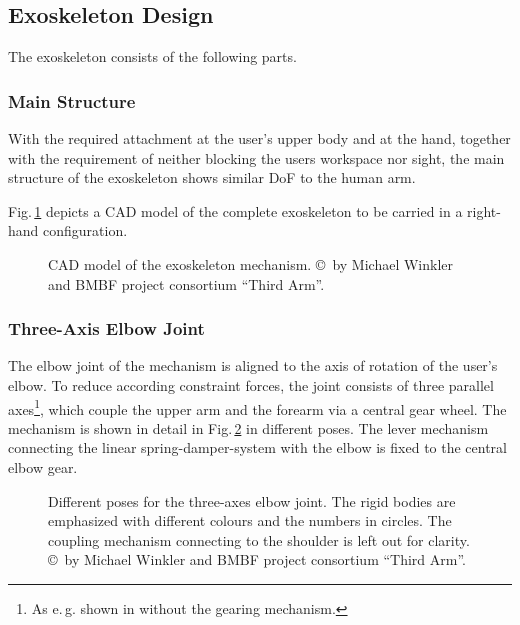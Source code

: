 \documentclass[twocolumn,10pt]{IFTOMM}
\begin{document}
\subsection{Exoskeleton Design}
\label{sec:exo_des}
The exoskeleton consists of the following parts.

\subsubsection{Main Structure}
\label{sec:exo_des_main}

With the required attachment at the user's upper body and at the hand, together with the requirement of neither blocking the users workspace nor sight, the main structure of the exoskeleton shows similar DoF to the human arm.

Fig.\,\ref{fig:KAS5_CAD} depicts a CAD model of the complete exoskeleton to be carried in a right-hand configuration.


\begin{figure}[tb!]
    
    \caption{CAD model of the exoskeleton mechanism. \copyright \, by Michael Winkler and BMBF project consortium ``Third Arm''.}
    \label{fig:KAS5_CAD}
\end{figure} 

\subsubsection{Three-Axis Elbow Joint}
\label{sec:exo_des_elbow}

The elbow joint of the mechanism is aligned to the axis of rotation of the user's elbow.
To reduce according constraint forces, the joint consists of three parallel axes\footnote{As e.\,g. shown in \cite{Pons2008} without the gearing mechanism.}, which couple the upper arm and the forearm via a central gear wheel.
The mechanism is shown in detail in Fig.\,\ref{fig:EllenbogenSimMech} in different poses.
The lever mechanism connecting the linear spring-damper-system with the elbow is fixed to the central elbow gear.

\begin{figure}[tb!]
    \small
    
    \caption{Different poses for the three-axes elbow joint. The rigid bodies are emphasized with different colours and the numbers in circles. The coupling mechanism connecting to the shoulder is left out for clarity. \copyright \, by Michael Winkler and BMBF project consortium ``Third Arm''.}
    \label{fig:EllenbogenSimMech}
\end{figure} 
\end{document}
